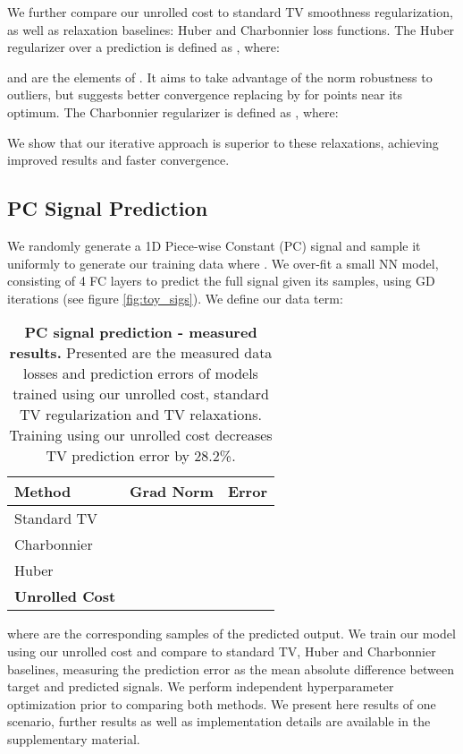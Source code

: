 \documentclass[10pt,twocolumn,letterpaper]{article}
\begin{document}
We further compare our unrolled cost to standard TV smoothness regularization, as well as  relaxation baselines: Huber \cite{huber1964robust} and Charbonnier \cite{charbonnier1997deterministic} loss functions.
The Huber regularizer over a prediction  is defined as , where:

and  are the elements of . It aims to take advantage of the  norm robustness to outliers, but suggests better convergence replacing  by  for points near its optimum. The Charbonnier regularizer is defined as , where:

We show that our iterative approach is superior to these  relaxations, achieving improved results and faster convergence.



\subsection{PC Signal Prediction} \label{sec:synthtetic}
We randomly generate a 1D Piece-wise Constant (PC) signal  and sample it uniformly to generate our training data  where . We over-fit a small NN model, consisting of 4 FC layers to predict the full signal given its samples, using GD iterations (see figure \ref{fig:toy_sigs}). We define our data term:
\begin{table}
\begin{center}
\begin{tabular}{l c c} 
    \toprule
    \textbf{Method} & \textbf{Grad Norm} & \textbf{Error} \\
    \midrule
    Standard TV     &    & \\
    Charbonnier \cite{charbonnier1997deterministic}    &    & \\
    Huber \cite{huber1964robust}           &    & \\    
    \textbf{Unrolled Cost}   &    & \\
    \bottomrule
\end{tabular}
\end{center}
\caption{\textbf{PC signal prediction - measured results.} Presented are the measured data losses and prediction errors of models trained using our unrolled cost, standard TV regularization and TV relaxations. Training using our unrolled cost decreases TV prediction error by 28.2\%.}
\label{ta:toy}
\end{table} 
where  are the corresponding samples of the predicted output. We train our model using our unrolled cost and compare to standard TV, Huber \cite{huber1964robust} and Charbonnier \nolinebreak \cite{charbonnier1997deterministic} baselines, measuring the prediction error as the mean absolute difference between target and predicted signals. We perform independent hyperparameter optimization prior to comparing both methods. 
We present here results of one scenario, further results as well as implementation details are available in the supplementary material. 
\end{document}
